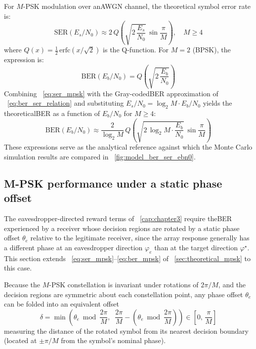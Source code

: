 For $M$-\gls{PSK} modulation over an\gls{AWGN} channel, the theoretical symbol error rate is:
\begin{equation}
    \label{eq:ser_mpsk}
    \mathrm{SER}(E_s/N_0) \approx 2\,Q\!\left(\sqrt{2\,\frac{E_s}{N_0}}\,\sin\frac{\pi}{M}\right), \quad M \geq 4
\end{equation}
where $Q(x) = \frac{1}{2}\,\mathrm{erfc}\!\left(x/\sqrt{2}\right)$ is the Q-function. For $M = 2$ (B\gls{PSK}), the expression is:
\begin{equation}
    \label{eq:ber_bpsk}
    \mathrm{BER}(E_b/N_0) = Q\!\left(\sqrt{2\,\frac{E_b}{N_0}}\right)
\end{equation}
Combining \equationname~\eqref{eq:ser_mpsk} with the Gray-coded\gls{BER} approximation of \equationname~\eqref{eq:ber_ser_relation} and substituting $E_s/N_0 = \log_2\!M \cdot E_b/N_0$ yields the theoretical\gls{BER} as a function of $E_b/N_0$ for $M \geq 4$:
\begin{equation}
    \label{eq:ber_mpsk}
    \mathrm{BER}(E_b/N_0) \approx \frac{2}{\log_2 M}\,Q\!\left(\sqrt{2\,\log_2\!M\cdot\frac{E_b}{N_0}}\,\sin\frac{\pi}{M}\right)
\end{equation}
These expressions serve as the analytical reference against which the Monte Carlo simulation results are compared in \figurename~\ref{fig:model_ber_ser_ebn0}.

\subsection{M-PSK performance under a static phase offset}
\label{sec:ber_phase_offset}

The eavesdropper-directed reward terms of \chaptername~\ref{cap:chapter3} require the\gls{BER} experienced by a receiver whose decision regions are rotated by a static phase offset $\theta_e$ relative to the legitimate receiver, since the array response generally has a different phase at an eavesdropper direction $\varphi_e$ than at the target direction $\varphi^\star$. This section extends \equationname~\eqref{eq:ser_mpsk}--\eqref{eq:ber_mpsk} of \sectionname~\ref{sec:theoretical_mpsk} to this case.

Because the $M$-\gls{PSK} constellation is invariant under rotations of $2\pi/M$, and the decision regions are symmetric about each constellation point, any phase offset $\theta_e$ can be folded into an equivalent offset
\begin{equation}
    \delta = \min\!\left(\theta_e \bmod \frac{2\pi}{M},\;\; \frac{2\pi}{M} - \left(\theta_e \bmod \frac{2\pi}{M}\right)\right) \in \left[0,\, \frac{\pi}{M}\right]
    \label{eq:phase_offset_fold}
\end{equation}
measuring the distance of the rotated symbol from its nearest decision boundary (located at $\pm\pi/M$ from the symbol's nominal phase).

